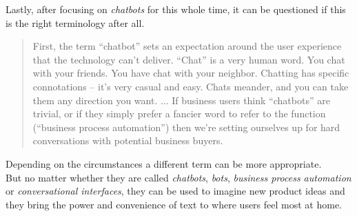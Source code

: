 Lastly, after focusing on \emph{chatbots} for this whole time,
it can be questioned if this is the right terminology after all\cite{botnerds}.

\begin{quote}
First, the term “chatbot” sets an expectation around the user experience that the technology can’t deliver.
“Chat” is a very human word.
You chat with your friends.
You have chat with your neighbor.
Chatting has specific connotations – it’s very casual and easy.
Chats meander, and you can take them any direction you want.
...
If business users think “chatbots” are trivial, or if they simply prefer a fancier word to refer to the function (“business process automation”) then we’re setting ourselves up for hard conversations with potential business buyers.
\end{quote}

Depending on the circumstances a different term can be more appropriate.
\\

But no matter whether they are called \emph{chatbots}, \emph{bots}, \emph{business process automation} or \emph{conversational interfaces},
they can be used to imagine new product ideas and they bring the power and convenience of text to where users feel most at home.
